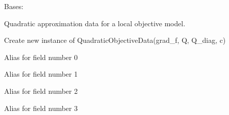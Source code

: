 \documentclass[letterpaper,10pt,english,openany,oneside]{sphinxmanual}
\begin{document}
\begin{fulllineitems}

\pysigstartsignatures
{}
\pysigstopsignatures
\sphinxAtStartPar
Bases: 

\sphinxAtStartPar
Quadratic approximation data for a local objective model.

\sphinxAtStartPar
Create new instance of QuadraticObjectiveData(grad\_f, Q, Q\_diag, c)


\begin{fulllineitems}

\pysigstartsignatures
{}
\pysigstopsignatures
\sphinxAtStartPar
Alias for field number 0

\end{fulllineitems}



\begin{fulllineitems}

\pysigstartsignatures
{}
\pysigstopsignatures
\sphinxAtStartPar
Alias for field number 1

\end{fulllineitems}



\begin{fulllineitems}

\pysigstartsignatures
{}
\pysigstopsignatures
\sphinxAtStartPar
Alias for field number 2

\end{fulllineitems}



\begin{fulllineitems}

\pysigstartsignatures
{}
\pysigstopsignatures
\sphinxAtStartPar
Alias for field number 3

\end{fulllineitems}


\end{fulllineitems}
\end{document}
